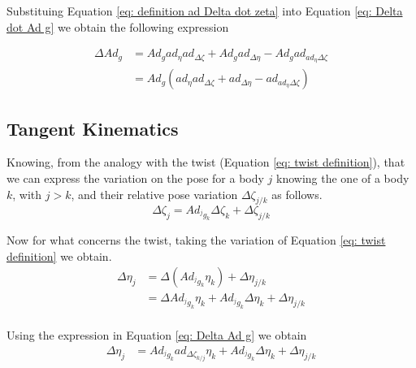 \documentclass[12pt,a4paper]{book}
\begin{document}
Substituing Equation \eqref{eq: definition ad Delta dot zeta} into Equation \eqref{eq: Delta dot Ad g} we obtain the following expression

\begin{equation}\label{eq: Delta dot Ad g final}
\begin{aligned}
	\Delta Ad_g 	&= Ad_g ad_\eta ad_{\Delta \zeta} + Ad_g ad_{\Delta \eta} - Ad_g ad_{ad_\eta \Delta \zeta} \\
					&= Ad_g \left( ad_\eta ad_{\Delta \zeta} +  ad_{\Delta \eta} -  ad_{ad_\eta \Delta \zeta} \right)
\end{aligned}
\end{equation}



\subsection{Tangent Kinematics}

Knowing, from the analogy with the twist (Equation \eqref{eq: twist definition}), that we can express the variation on the pose for a body $j$ knowing the one of a body $k$, with $j>k$, and their relative pose variation $\Delta \zeta_{j/k}$ as follows.
\begin{equation}
	\Delta \zeta _ j = Ad_{^j g _k} \Delta \zeta _k + \Delta \zeta _ {j/k}
\end{equation}


Now for what concerns the twist, taking the variation of Equation \eqref{eq: twist definition} we obtain.
\begin{equation}
\begin{aligned}
	\Delta \eta_j 	&= \Delta \left( Ad_{^j g_k} \eta_k \right) + \Delta \eta_{j/k} \\
					&= \Delta  Ad_{^j g_k} \eta_k + Ad_{^j g_k} \Delta \eta_k  + \Delta \eta_{j/k} \\
\end{aligned}
\end{equation}

Using the expression in Equation \eqref{eq: Delta Ad g} we obtain 
\begin{equation}\label{eq: delta eta 1}
\begin{aligned}
	\Delta \eta_j 	&= Ad_{^j g_k} ad_{\Delta \zeta_{k/j}} \eta_k + Ad_{^j g_k} \Delta \eta_k  + \Delta \eta_{j/k} \\
\end{aligned}
\end{equation}
\end{document}
